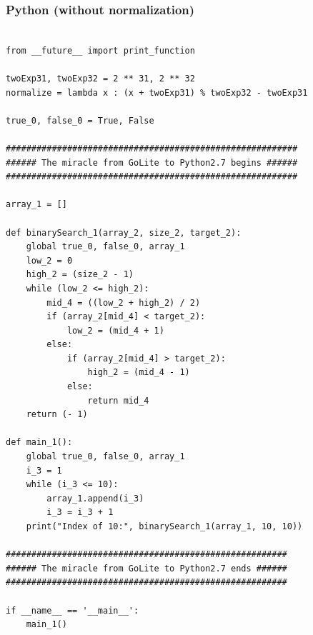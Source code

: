 \documentclass{article}
\begin{document}
\subsubsection{Python (without normalization)}

\begin{lstlisting}

from __future__ import print_function

twoExp31, twoExp32 = 2 ** 31, 2 ** 32
normalize = lambda x : (x + twoExp31) % twoExp32 - twoExp31

true_0, false_0 = True, False

#########################################################
###### The miracle from GoLite to Python2.7 begins ######
#########################################################

array_1 = []

def binarySearch_1(array_2, size_2, target_2):
	global true_0, false_0, array_1
	low_2 = 0
	high_2 = (size_2 - 1)
	while (low_2 <= high_2):
		mid_4 = ((low_2 + high_2) / 2)
		if (array_2[mid_4] < target_2):
			low_2 = (mid_4 + 1)
		else:
			if (array_2[mid_4] > target_2):
				high_2 = (mid_4 - 1)
			else:
				return mid_4
	return (- 1)

def main_1():
	global true_0, false_0, array_1
	i_3 = 1
	while (i_3 <= 10):
		array_1.append(i_3)
		i_3 = i_3 + 1
	print("Index of 10:", binarySearch_1(array_1, 10, 10))

#######################################################
###### The miracle from GoLite to Python2.7 ends ######
#######################################################

if __name__ == '__main__':
	main_1()
\end{lstlisting}
\end{document}
